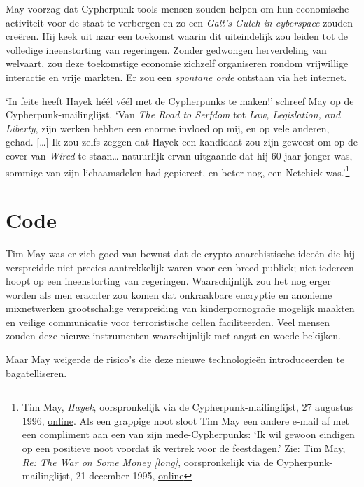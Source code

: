 \documentclass[
  a5paper,
  smalldemyvopaper,11pt,twoside,onecolumn,openright,extrafontsizes,
hidelinks]{memoir}
\begin{document}
May voorzag dat Cypherpunk-tools mensen zouden helpen om hun economische
activiteit voor de staat te verbergen en zo een \emph{Galt's Gulch in
cyberspace} zouden creëren. Hij keek uit naar een toekomst waarin dit
uiteindelijk zou leiden tot de volledige ineenstorting van regeringen.
Zonder gedwongen herverdeling van welvaart, zou deze toekomstige
economie zichzelf organiseren rondom vrijwillige interactie en vrije
markten. Er zou een \emph{spontane orde} ontstaan via het internet.

`In feite heeft Hayek héél véél met de Cypherpunks te maken!' schreef
May op de Cypherpunk-mailinglijst. `Van \emph{The Road to Serfdom} tot
\emph{Law, Legislation, and Liberty}, zijn werken hebben een enorme
invloed op mij, en op vele anderen, gehad. {[}\ldots{]} Ik zou zelfs
zeggen dat Hayek een kandidaat zou zijn geweest om op de cover van
\emph{Wired} te staan\ldots{} natuurlijk ervan uitgaande dat hij 60 jaar
jonger was, sommige van zijn lichaamsdelen had gepiercet, en beter nog,
een Netchick was.'\footnote{Tim May, \emph{Hayek}, oorspronkelijk via de
  Cypherpunk-mailinglijst, 27 augustus 1996,
  \href{https://cypherpunks.venona.com/date/1996/08/msg02102.html}{online}.
  Als een grappige noot sloot Tim May een andere e-mail af met een
  compliment aan een van zijn mede-Cypherpunks: `Ik wil gewoon eindigen
  op een positieve noot voordat ik vertrek voor de feestdagen.' Zie: Tim
  May, \emph{Re: The War on Some Money {[}long{]}}, oorspronkelijk via
  de Cypherpunk-mailinglijst, 21 december 1995,
  \href{https://cypherpunks.venona.com/date/1995/12/msg01044.html}{online}}

\section{Code}\label{code}

Tim May was er zich goed van bewust dat de crypto-anarchistische ideeën
die hij verspreidde niet precies aantrekkelijk waren voor een breed
publiek; niet iedereen hoopt op een ineenstorting van regeringen.
Waarschijnlijk zou het nog erger worden als men erachter zou komen dat
onkraakbare encryptie en anonieme mixnetwerken grootschalige
verspreiding van kinderpornografie mogelijk maakten en veilige
communicatie voor terroristische cellen faciliteerden. Veel mensen
zouden deze nieuwe instrumenten waarschijnlijk met angst en woede
bekijken.

Maar May weigerde de risico's die deze nieuwe technologieën
introduceerden te bagatelliseren.
\end{document}
